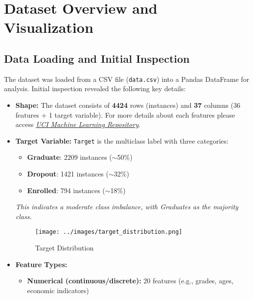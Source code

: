 \documentclass[twoside,final]{hcmut-report}
\begin{document}
\section{Dataset Overview and Visualization}
\subsection{Data Loading and Initial Inspection}

The dataset was loaded from a CSV file (\texttt{data.csv}) into a Pandas DataFrame for analysis. Initial inspection revealed the following key details:

\begin{itemize}[parsep=0pt, itemsep=0pt, topsep=0pt]
  \item \textbf{Shape:} The dataset consists of \textbf{4424} rows (instances) and \textbf{37} columns (36 features + 1 target variable). For more details about each features please access \href{https://archive.ics.uci.edu/dataset/697/predict+students+dropout+and+academic+success}{\textit{UCI Machine Learning Repository}}.
  \item \textbf{Target Variable:} \texttt{Target} is the multiclass label with three categories:\\
        \begin{minipage}{0.48\textwidth}
          \begin{itemize}
            \item \textbf{Graduate}: 2209 instances ($\sim$50\%)
            \item \textbf{Dropout}: 1421 instances ($\sim$32\%)
            \item \textbf{Enrolled}: 794 instances ($\sim$18\%)
          \end{itemize}
          \textit{This indicates a moderate class imbalance, with Graduates as the majority class.}
        \end{minipage}
        \hfill
        \begin{minipage}{0.48\textwidth}
          \begin{figure}[H]
            \centering
            \texttt{[image: ../images/target\_distribution.png]}
            \caption{Target Distribution}
            \label{target-distribution}
          \end{figure}
        \end{minipage}
  \item \textbf{Feature Types:}
        \begin{itemize}
          \item \textbf{Numerical (continuous/discrete):} 20 features (e.g., grades, ages, economic indicators)

\end{itemize}
\end{itemize}
\end{document}
